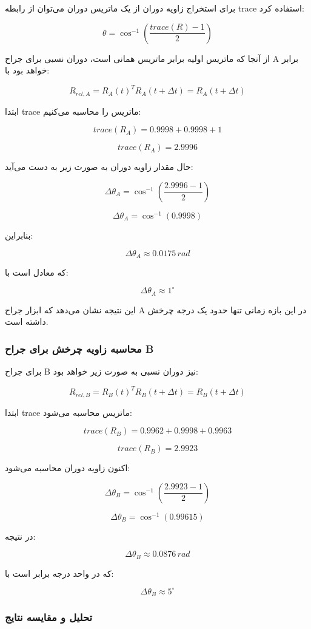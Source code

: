 \documentclass{article}
\begin{document}
برای استخراج زاویه دوران از یک ماتریس دوران می‌توان از رابطه trace استفاده کرد:

\[
\theta =
\cos^{-1}
\left(
\frac{trace(R)-1}{2}
\right)
\]

از آنجا که ماتریس اولیه برابر ماتریس همانی است، دوران نسبی برای جراح A برابر خواهد بود با:

\[
R_{rel,A}=R_A(t)^T R_A(t+\Delta t)=R_A(t+\Delta t)
\]

ابتدا trace ماتریس را محاسبه می‌کنیم:

\[
trace(R_A)=0.9998+0.9998+1
\]

\[
trace(R_A)=2.9996
\]

حال مقدار زاویه دوران به صورت زیر به دست می‌آید:

\[
\Delta\theta_A=
\cos^{-1}
\left(
\frac{2.9996-1}{2}
\right)
\]

\[
\Delta\theta_A=
\cos^{-1}(0.9998)
\]

بنابراین:

\[
\Delta\theta_A \approx 0.0175 \, rad
\]

که معادل است با:

\[
\Delta\theta_A \approx 1^\circ
\]

این نتیجه نشان می‌دهد که ابزار جراح A در این بازه زمانی تنها حدود یک درجه چرخش داشته است.

\subsubsection{محاسبه زاویه چرخش برای جراح B}

برای جراح B نیز دوران نسبی به صورت زیر خواهد بود:

\[
R_{rel,B}=R_B(t)^T R_B(t+\Delta t)=R_B(t+\Delta t)
\]

ابتدا trace ماتریس محاسبه می‌شود:

\[
trace(R_B)=0.9962+0.9998+0.9963
\]

\[
trace(R_B)=2.9923
\]

اکنون زاویه دوران محاسبه می‌شود:

\[
\Delta\theta_B=
\cos^{-1}
\left(
\frac{2.9923-1}{2}
\right)
\]

\[
\Delta\theta_B=
\cos^{-1}(0.99615)
\]

در نتیجه:

\[
\Delta\theta_B \approx 0.0876 \, rad
\]

که در واحد درجه برابر است با:

\[
\Delta\theta_B \approx 5^\circ
\]

\subsubsection{تحلیل و مقایسه نتایج}
\end{document}
